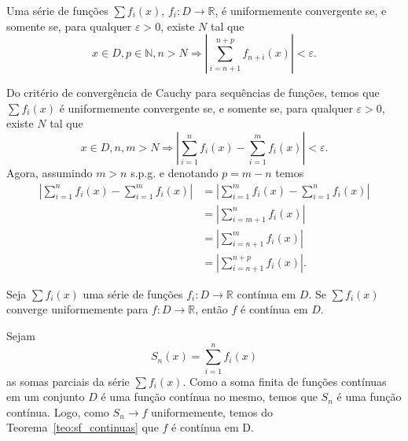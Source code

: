 \begin{teo}
  Uma série de funções $\sum f_i(x)$, $f_i:D\to\mathbb{R}$, é uniformemente convergente se, e somente se, para qualquer $\varepsilon>0$, existe $N$ tal que
  \begin{equation}
    x\in D, p\in\mathbb{N}, n>N \Rightarrow \left|\sum_{i=n+1}^{n+p} f_{n+i}(x)\right| < \varepsilon.
  \end{equation}
\end{teo}
\begin{dem}
  Do critério de convergência de Cauchy para sequências de funções, temos que $\sum f_i(x)$ é uniformemente convergente se, e somente se, para qualquer $\varepsilon>0$, existe $N$ tal que
  \begin{equation}
    x\in D, n,m>N \Rightarrow \left|\sum_{i=1}^n f_i(x) - \sum_{i=1}^m f_i(x)\right| < \varepsilon.
  \end{equation}
Agora, assumindo $m>n$ s.p.g. e denotando $p=m-n$ temos
\begin{align}
  \left|\sum_{i=1}^n f_i(x) - \sum_{i=1}^m f_i(x)\right| &= \left|\sum_{i=1}^m f_i(x) - \sum_{i=1}^n f_i(x)\right|\\
                                                         &= \left|\sum_{i=m+1}^n f_i(x)\right| \\
                                                         &= \left|\sum_{i=n+1}^m f_i(x)\right|\\
                                                         &= \left|\sum_{i=n+1}^{n+p} f_i(x)\right|.
    \end{align}
\end{dem}

\begin{teo}
  Seja $\sum f_i(x)$ uma série de funções $f_i:D\to\mathbb{R}$ contínua em $D$. Se $\sum f_i(x)$ converge uniformemente para $f:D\to\mathbb{R}$, então $f$ é contínua em $D$.
\end{teo}
\begin{dem}
  Sejam
  \begin{equation}
    S_n(x) = \sum_{i=1}^n f_i(x)
  \end{equation}
as somas parciais da série $\sum f_i(x)$. Como a soma finita de funções contínuas em um conjunto $D$ é uma função contínua no mesmo, temos que $S_n$ é uma função contínua. Logo, como $S_n\to f$ uniformemente, temos do Teorema~\ref{teo:sf_continuas} que $f$ é contínua em D.
\end{dem}

